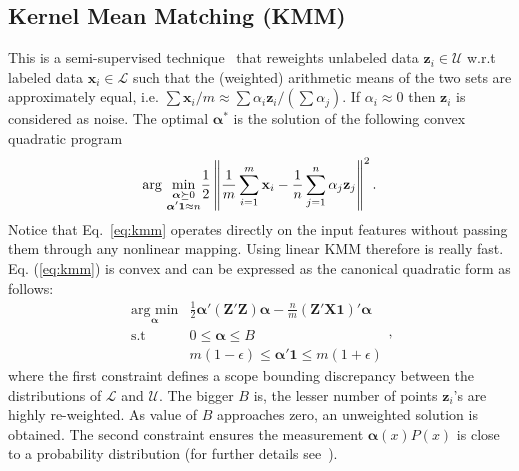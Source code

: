 \documentclass[preprint,12pt]{elsarticle}
\begin{document}
\subsection{Kernel Mean Matching (KMM)} 
This is a semi-supervised technique~\cite{DBLP:conf/nips/HuangSGBS06} that reweights unlabeled data  $\mathbf{z}_i \in \mathcal{U}$  w.r.t labeled data $\mathbf{x}_i \in \mathcal{L}$ such that the (weighted) arithmetic means of the two sets are approximately equal, i.e. $\sum \mathbf{x}_i/m \approx \sum \alpha_i \mathbf{z}_i/\left( \sum \alpha_j \right)$. If $\alpha_i \approx 0$ then $\mathbf{z}_i$ is considered as noise. The optimal $\boldsymbol{\alpha}^*$ is the solution of the following convex quadratic program
\begin{equation}
\text{arg }\underset{\begin{subarray}{c} \boldsymbol{\alpha} \succeq 0 \\ \boldsymbol{\alpha}' \mathbf{1} \approx n  \end{subarray}}{\text{min}} \frac{1}{2} \left\Vert \frac{1}{m} \sum_{i=1}^m \mathbf{x}_i - \frac{1}{n} \sum_{j=1}^n \alpha_j \mathbf{z}_j \right\Vert^2.
\label{eq:kmm}
\end{equation} 
Notice that Eq.~\ref{eq:kmm} operates directly on the input features without passing them through any nonlinear mapping. Using linear KMM therefore is really fast. Eq. (\ref{eq:kmm}) is convex and can be expressed as the canonical quadratic form as follows:
\begin{equation}
\begin{array}{cl}
\underset{\boldsymbol{\alpha}}{\text{arg min}} & \frac{1}{2} \boldsymbol{\alpha}' \left( \mathbf{Z}' \mathbf{Z} \right) \boldsymbol{\alpha} - \frac{n}{m} (\mathbf{Z}' \mathbf{X} \mathbf{1})' \boldsymbol{\alpha} \\
\text{s.t} & 0 \leq \boldsymbol{\alpha} \leq B \\
 & m(1-\epsilon) \leq \boldsymbol{\alpha}' \mathbf{1} \leq m(1 + \epsilon)
 \label{eq:kmm2}
\end{array},
\end{equation} where the first constraint defines a scope bounding discrepancy between the distributions of $\mathcal{L}$ and $\mathcal{U}$. The bigger $B$ is, the lesser number of points $\mathbf{z}_i$'s are highly re-weighted. As value of $B$ approaches zero, an unweighted solution is obtained. The second constraint ensures the measurement $\boldsymbol{\alpha}(x)P(x)$ is close to a probability distribution (for further details see~\cite{DBLP:conf/cvpr/ChuTC13}).
\end{document}
